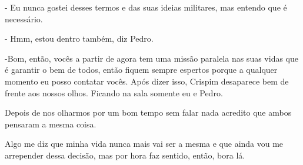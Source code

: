 - Eu nunca gostei desses termos e das suas ideias militares, mas entendo que é necessário.

- Hmm, estou dentro também, diz Pedro.

-Bom, então, vocês a partir de agora tem uma missão paralela nas suas vidas que é garantir o bem de todos, então fiquem sempre espertos porque a qualquer momento eu posso contatar vocês. Após dizer isso, Crispim desaparece bem de frente aos nossos olhos. Ficando na sala somente eu e Pedro.

Depois de nos olharmos por um bom tempo sem falar nada acredito que ambos pensaram a mesma coisa.

Algo me diz que minha vida nunca mais vai ser a mesma e que ainda vou me arrepender dessa decisão, mas por hora faz sentido, então, bora lá.



